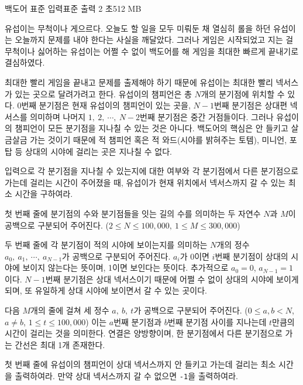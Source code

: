 \begin{problem}{백도어}
    {표준 입력}{표준 출력}
    {2 초}{512 MB}{}
    
    유섭이는 무척이나 게으르다. 오늘도 할 일을 모두 미뤄둔 채 열심히 롤을 하던 유섭이는 오늘까지 문제를 내야 한다는 사실을 깨달았다. 그러나 게임은 시작되었고 지는 걸 무척이나 싫어하는 유섭이는 어쩔 수 없이 백도어를 해 게임을 최대한 빠르게 끝내기로 결심하였다.
    
    최대한 빨리 게임을 끝내고 문제를 출제해야 하기 때문에 유섭이는 최대한 빨리 넥서스가 있는 곳으로 달려가려고 한다. 유섭이의 챔피언은 총 $ N $개의 분기점에 위치할 수 있다. 0번째 분기점은 현재 유섭이의 챔피언이 있는 곳을, $ N-1 $번째 분기점은 상대편 넥서스를 의미하며 나머지 $ 1,\ 2,\ \cdots,\ N-2 $번째 분기점은 중간 거점들이다. 그러나 유섭이의 챔피언이 모든 분기점을 지나칠 수 있는 것은 아니다. 백도어의 핵심은 안 들키고 살금살금 가는 것이기 때문에 적 챔피언 혹은 적 와드(시야를 밝혀주는 토템), 미니언, 포탑 등 상대의 시야에 걸리는 곳은 지나칠 수 없다.
    
    입력으로 각 분기점을 지나칠 수 있는지에 대한 여부와 각 분기점에서 다른 분기점으로 가는데 걸리는 시간이 주어졌을 때, 유섭이가 현재 위치에서 넥서스까지 갈 수 있는 최소 시간을 구하여라.
    
    \InputFile
    
    첫 번째 줄에 분기점의 수와 분기점들을 잇는 길의 수를 의미하는 두 자연수 $ N $과 $ M $이 공백으로 구분되어 주어진다. ($ 2 \leq N \leq 100,000,\ 1 \leq M \leq 300,000 $)
    
    두 번째 줄에 각 분기점이 적의 시야에 보이는지를 의미하는 $ N $개의 정수 $ a_0,\ a_1,\ \cdots,\ a_{N-1} $가 공백으로 구분되어 주어진다. $ a_i $가 0이면 $ i $번째 분기점이 상대의 시야에 보이지 않는다는 뜻이며, 1이면 보인다는 뜻이다. 추가적으로 $ a_0 = 0 $, $ a_{N-1} = 1 $이다. $ N-1 $번째 분기점은 상대 넥서스이기 때문에 어쩔 수 없이 상대의 시야에 보이게 되며, 또 유일하게 상대 시야에 보이면서 갈 수 있는 곳이다.
    
    다음 $ M $개의 줄에 걸쳐 세 정수 $ a,\ b,\ t $가 공백으로 구분되어 주어진다. ($ 0 \leq a, b < N$, $a \neq b$, $1 \leq t \leq 100,000 $) 이는 $ a $번째 분기점과 $ b $번째 분기점 사이를 지나는데 $ t $만큼의 시간이 걸리는 것을 의미한다. 연결은 양방향이며, 한 분기점에서 다른 분기점으로 가는 간선은 최대 1개 존재한다.
    
    \OutputFile
    첫 번째 줄에 유섭이의 챔피언이 상대 넥서스까지 안 들키고 가는데 걸리는 최소 시간을 출력하여라. 만약 상대 넥서스까지 갈 수 없으면 \verb|-1|을 출력하여라.
    

\end{problem}
